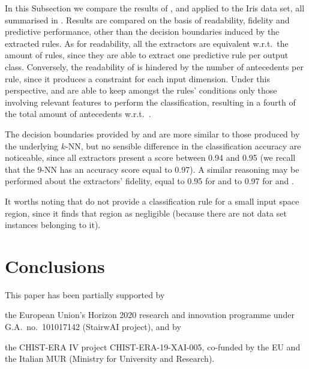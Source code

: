 \documentclass[
]{ceurart}
\begin{document}


In this Subsection we compare the results of \cart{}, \iter{} and \gridex{} applied to the Iris data set, all summarised in .
%
Results are compared on the basis of readability, fidelity and predictive performance, other than the decision boundaries induced by the extracted rules.
%
As for readability, all the extractors are equivalent w.r.t.\ the amount of rules, since they are able to extract one predictive rule per output class.
%
Conversely, the readability of \iter{} is hindered by the number of antecedents per rule, since it produces a constraint for each input dimension.
%
Under this perspective, \cart{} and \gridex{} are able to keep amongst the rules' conditions only those involving relevant features to perform the classification, resulting in a fourth of the total amount of antecedents w.r.t.\ \iter{}.

The decision boundaries provided by \gridex{} and \iter{} are more similar to those produced by the underlying $k$-NN, but no sensible difference in the classification accuracy are noticeable, since all extractors present a score between 0.94 and 0.95 (we recall that the 9-NN has an accuracy score equal to 0.97).
%
A similar reasoning may be performed about the extractors' fidelity, equal to 0.95 for \cart{} and to 0.97 for \iter{} and \gridex{}.

It worths noting that \gridex{} do not provide a classification rule for a small input space region, since it finds that region as negligible (because there are not data set instances belonging to it).

\section{Conclusions}\label{sec:conclusions}



\begin{acknowledgments}
	This paper has been partially supported by
	\begin{inlinelist}
		\item the European Union's Horizon 2020 research and innovation programme under G.A.\ no.\ 101017142 (StairwAI project), and by
		\item the CHIST-ERA IV project CHIST-ERA-19-XAI-005, co-funded by the EU and the Italian MUR (Ministry for University and Research).
	\end{inlinelist}
\end{acknowledgments}


\end{document}

